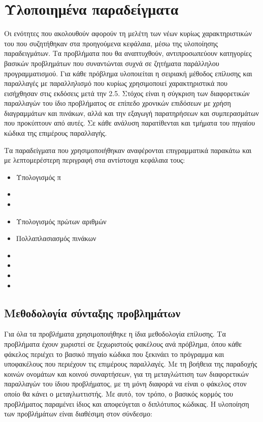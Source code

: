 \clearpage
\section{Υλοποιημένα παραδείγματα}
Οι ενότητες που ακολουθούν αφορούν τη μελέτη των νέων κυρίως χαρακτηριστικών του \emph{} που συζητήθηκαν στα προηγούμενα κεφάλαια, μέσω της υλοποίησης
παραδειγμάτων. Τα προβλήματα που θα αναπτυχθούν, αντιπροσωπεύουν κατηγορίες βασικών προβλημάτων που συναντώνται συχνά σε
ζητήματα παράλληλου προγραμματισμού. Για κάθε πρόβλημα υλοποιείται η σειριακή μέθοδος επίλυσης και παραλλαγές με
παραλληλισμό που κυρίως χρησιμοποιεί χαρακτηριστικά που εισήχθησαν στις εκδόσεις μετά την 2.5. Στόχος είναι η σύγκριση
των διαφορετικών παραλλαγών του ίδιο προβλήματος σε επίπεδο χρονικών επιδόσεων με χρήση διαγραμμάτων και πινάκων, αλλά
και την εξαγωγή παρατηρήσεων και συμπερασμάτων που προκύπτουν από αυτές. Σε κάθε ανάλυση παρατίθενται και τμήματα του
πηγαίου κώδικα της επιμέρους παραλλαγής.

Τα παραδείγματα που χρησιμοποιήθηκαν αναφέρονται επιγραμματικά παρακάτω και με λεπτομερέστερη περιγραφή στα αντίστοιχα
κεφάλαια τους:
\begin{itemize}
    \item Υπολογισμός π
    \item {}
    \item {}
    \item Υπολογισμός πρώτων αριθμών
    \item Πολλαπλασιασμός πινάκων
    \item {}
    \item {}
    \item {}
    \item {}
\end{itemize}

\clearpage
\subsection{Μεθοδολογία σύνταξης προβλημάτων}
Για όλα τα προβλήματα χρησιμοποιήθηκε η ίδια μεθοδολογία επίλυσης. Τα προβλήματα έχουν χωριστεί σε ξεχωριστούς φακέλους
ανά πρόβλημα, όπου κάθε φάκελος περιέχει το βασικό πηγαίο κώδικα που ξεκινάει το πρόγραμμα και υποφακέλους που περιέχουν
τις επιμέρους παραλλαγές. Με τη βοήθεια της παραδοχής κοινών ονομάτων και κοινού  συναρτήσεων, για τη μεταγλώττιση των διαφορετικών παραλλαγών του ίδιου προβλήματος, με τη μόνη διαφορά να είναι ο φάκελος στον οποίο θα κάνει  ο
μεταγλωττιστής. Με αυτό, τον τρόπο, ο βασικός κορμός του προβλήματος παραμένει ίδιος και αποφεύγεται ο διπλότυπος
κώδικας. Η υλοποίηση των προβλήμάτων είναι διαθέσιμη στον σύνδεσμο:

